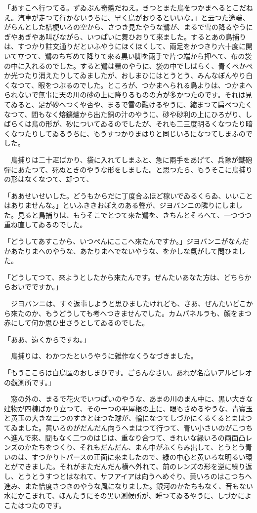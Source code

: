 \documentclass[tate,paper=b6j,jafontsize=9pt]{jlreq}
\begin{document}
「あすこへ行つてる。ずゐぶん奇體だねえ。きつとまた鳥をつかまへるとこだねえ。汽車が走つて行かないうちに、早く鳥がおりるといいな。」と云つた途端、がらんとした桔梗いろの空から、さつき見たやうな鷺が、まるで雪の降るやうにぎやあぎやあ叫びながら、いつぱいに舞ひおりて來ました。するとあの鳥捕りは、すつかり註文通りだといふやうにほくほくして、兩足をかつきり六十度に開いて立つて、鷺のちぢめて降りて來る黒い脚を兩手で片つ端から押へて、布の袋の中に入れるのでした。すると鷺は螢のやうに、袋の中でしばらく、青くぺかぺか光つたり消えたりしてゐましたが、おしまひにはとうとう、みんなぼんやり白くなつて、眼をつぶるのでした。ところが、つかまへられる鳥よりは、つかまへられないで無事に天の川の砂の上に降りるものの方が多かつたのです。それは見てゐると、足が砂へつくや否や、まるで雪の融けるやうに、縮まつて扁べつたくなつて、間もなく熔鑛爐から出た銅の汁のやうに、砂や砂利の上にひろがり、しばらくは鳥の形が、砂についてゐるのでしたが、それも二三度明るくなつたり暗くなつたりしてゐるうちに、もうすつかりまはりと同じいろになつてしまふのでした。

　鳥捕りは二十疋ばかり、袋に入れてしまふと、急に兩手をあげて、兵隊が鐵砲彈にあたつて、死ぬときのやうな形をしました。と思つたら、もうそこに鳥捕りの形はなくなつて、却つて、

「ああせいせいした。どうもからだに丁度合ふほど稼いでゐるくらゐ、いいことはありませんな。」といふききおぼえのある聲が、ジヨバンニの隣りにしました。見ると鳥捕りは、もうそこでとつて來た鷺を、きちんとそろへて、一つづつ重ね直してゐるのでした。

「どうしてあすこから、いつぺんにここへ來たんですか。」ジヨバンニがなんだかあたりまへのやうな、あたりまへでないやうな、をかしな氣がして問ひました。

「どうしてつて、來ようとしたから來たんです。ぜんたいあなた方は、どちらからおいでですか。」

　ジヨバンニは、すぐ返事しようと思ひましたけれども、さあ、ぜんたいどこから來たのか、もうどうしても考へつきませんでした。カムパネルラも、顏をまつ赤にして何か思ひ出さうとしてゐるのでした。

「ああ、遠くからですね。」

　鳥捕りは、わかつたというやうに雜作なくうなづきました。



「もうここらは白鳥區のおしまひです。ごらんなさい。あれが名高いアルビレオの觀測所です。」

　窓の外の、まるで花火でいつぱいのやうな、あまの川のまん中に、黒い大きな建物が四棟ばかり立つて、その一つの平屋根の上に、眼もさめるやうな、青寶玉と黄玉の大きな二つのすきとほつた球が、輪になつてしづかにくるくるとまはつてゐました。黄いろのがだんだん向うへまはつて行つて、青い小さいのがこつちへ進んで來、間もなく二つのはじは、重なり合つて、きれいな緑いろの兩面凸レンズのかたちをつくり、それもだんだん、まん中がふくらみ出して、とうとう青いのは、すつかりトパースの正面に來ましたので、緑の中心と黄いろな明るい環とができました。それがまただんだん横へ外れて、前のレンズの形を逆に繰り返し、とうとうすつとはなれて、サフアイアは向うへめぐり、黄いろのはこつちへ進み、また恰度さつきのやうな風になりました。銀河のかたちもなく、音もない水にかこまれて、ほんたうにその黒い測候所が、睡つてゐるやうに、しづかによこたはつたのです。
\end{document}
